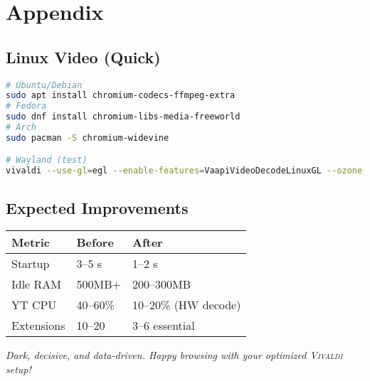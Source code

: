 \documentclass[10pt,a4paper,oneside]{book}
\newcommand{\vivaldi}{\textsc{Vivaldi}}
\begin{document}
\chapter{Appendix}
\section{Linux Video (Quick)}
\begin{codebox}
\begin{lstlisting}[language=bash]
# Ubuntu/Debian
sudo apt install chromium-codecs-ffmpeg-extra
# Fedora
sudo dnf install chromium-libs-media-freeworld
# Arch
sudo pacman -S chromium-widevine

# Wayland (test)
vivaldi --use-gl=egl --enable-features=VaapiVideoDecodeLinuxGL --ozone-platform=wayland
\end{lstlisting}
\end{codebox}

\section{Expected Improvements}
\begin{center}
\begin{tabular}{@{}lll@{}}
\toprule
\textbf{Metric} & \textbf{Before} & \textbf{After} \\
\midrule
Startup & 3–5 s & 1–2 s \\
Idle RAM & 500MB+ & 200–300MB \\
YT CPU & 40–60\% & 10–20\% (HW decode) \\
Extensions & 10–20 & 3–6 essential \\
\bottomrule
\end{tabular}
\end{center}

\vspace{0.6cm}
\begin{center}
\textit{Dark, decisive, and data-driven. Happy browsing with your optimized \vivaldi{} setup!}
\end{center}
\end{document}
